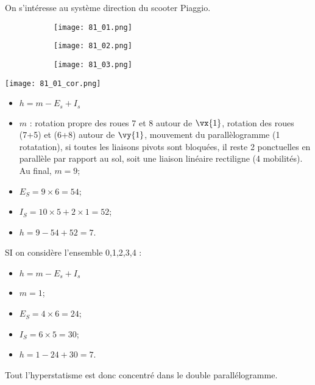 \normaltrue \difficilefalse \tdifficilefalse
\correctionfalse

\setcounter{question}{0}%


\ifcorrection
\else
{}
\fi


\ifprof
\else
On s'intéresse au système direction du scooter Piaggio.
\begin{figure*}[!h]
\centering
\begin{subfigure}[c]{.3\linewidth}
\centering
\texttt{[image: 81\_01.png]}
\end{subfigure} \hfill
\begin{subfigure}[c]{.3\linewidth}
\centering
\texttt{[image: 81\_02.png]}
\end{subfigure} \hfill
\begin{subfigure}[c]{.3\linewidth}
\centering
\texttt{[image: 81\_03.png]}
\end{subfigure} 
\end{figure*}
\fi

\ifprof
\begin{center}
\texttt{[image: 81\_01\_cor.png]}
\end{center}
\else
\fi

\ifprof
\begin{itemize}
\item $h = m -E_s + I_s$ 
\item $m$ : rotation propre des roues 7 et 8 autour de $\vx{1}$, rotation des roues (7+5) et (6+8) autour de $\vy{1}$,  mouvement du parallèlogramme (1 rotatation), si toutes les liaisons pivots sont bloquées, il reste 2 ponctuelles en parallèle par rapport au sol, soit une liaison linéaire rectiligne (4 mobilités). Au final, $m=9$;
\item $E_S =9\times 6 = 54$;
\item $I_S = 10\times 5 + 2 \times 1 = 52$;
\item $h = 9 -54 + 52 = 7$.
\end{itemize}
\else
\fi
{}
\ifprof
SI on considère l'ensemble 0,1,2,3,4 : 
\begin{itemize}
\item $h = m -E_s + I_s$ 
\item $m = 1$; 
\item $E_S =4\times 6 = 24$;
\item $I_S = 6\times 5  = 30$;
\item $h = 1 -24 + 30 = 7$. 
\end{itemize}
Tout l'hyperstatisme est donc concentré dans le double parallélogramme. 

